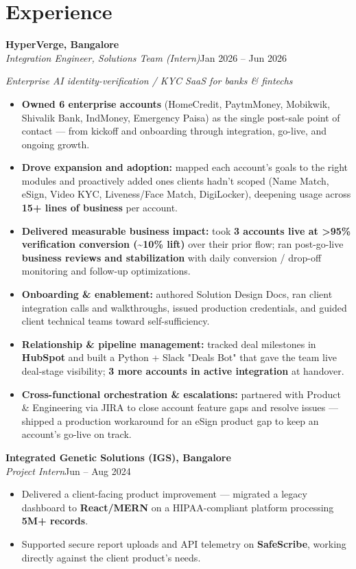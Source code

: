 \documentclass[10pt,a4paper]{article}
\begin{document}
\section*{Experience}
\vspace{1pt}\textbf{HyperVerge, Bangalore}\\
\textit{Integration Engineer, Solutions Team (Intern)}\hfill Jan 2026 -- Jun 2026\par\vspace{1pt}
{\small\itshape Enterprise AI identity-verification / KYC SaaS for banks \& fintechs}\par\vspace{1pt}
\begin{itemize}
\item \textbf{Owned 6 enterprise accounts} (HomeCredit, PaytmMoney, Mobikwik, Shivalik Bank, IndMoney, Emergency Paisa) as the single post-sale point of contact --- from kickoff and onboarding through integration, go-live, and ongoing growth.
\item \textbf{Drove expansion and adoption:} mapped each account's goals to the right modules and proactively added ones clients hadn't scoped (Name Match, eSign, Video KYC, Liveness/Face Match, DigiLocker), deepening usage across \textbf{15+ lines of business} per account.
\item \textbf{Delivered measurable business impact:} took \textbf{3 accounts live at \textgreater{}95\% verification conversion (\textasciitilde{}10\% lift)} over their prior flow; ran post-go-live \textbf{business reviews and stabilization} with daily conversion / drop-off monitoring and follow-up optimizations.
\item \textbf{Onboarding \& enablement:} authored Solution Design Docs, ran client integration calls and walkthroughs, issued production credentials, and guided client technical teams toward self-sufficiency.
\item \textbf{Relationship \& pipeline management:} tracked deal milestones in \textbf{HubSpot} and built a Python + Slack "Deals Bot" that gave the team live deal-stage visibility; \textbf{3 more accounts in active integration} at handover.
\item \textbf{Cross-functional orchestration \& escalations:} partnered with Product \& Engineering via JIRA to close account feature gaps and resolve issues --- shipped a production workaround for an eSign product gap to keep an account's go-live on track.
\end{itemize}
\vspace{1pt}\textbf{Integrated Genetic Solutions (IGS), Bangalore}\\
\textit{Project Intern}\hfill Jun -- Aug 2024\par\vspace{1pt}
\begin{itemize}
\item Delivered a client-facing product improvement --- migrated a legacy dashboard to \textbf{React/MERN} on a HIPAA-compliant platform processing \textbf{5M+ records}.
\item Supported secure report uploads and API telemetry on \textbf{SafeScribe}, working directly against the client product's needs.
\end{itemize}
\end{document}
